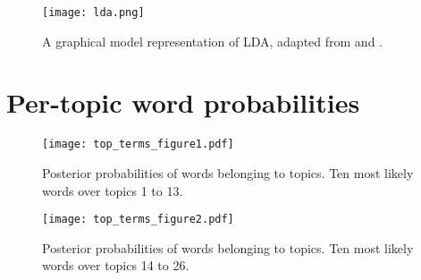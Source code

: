 \begin{figure}[!ht]
	\centering
	\texttt{[image: lda.png]}
	\caption{A graphical model representation of LDA, adapted from \cite{blei_latent_2003} and \cite{blei_topic_2009}.}
	\label{fig:lda}
\end{figure}

\section{Per-topic word probabilities} \label{words_over_topics}

\begin{figure}[!ht]
	\centering
	\texttt{[image: top\_terms\_figure1.pdf]}
	\caption{Posterior probabilities of words belonging to topics. Ten most likely words over topics 1 to 13.}
	\label{fig:top_terms_1}
\end{figure}

\begin{figure}[!ht]
	\centering
	\texttt{[image: top\_terms\_figure2.pdf]}
	\caption{Posterior probabilities of words belonging to topics. Ten most likely words over topics 14 to 26.}
	\label{fig:top_terms_2}
\end{figure}